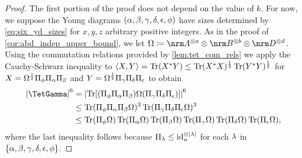 \documentclass[notitlepage, 10pt]{article}
\begin{document}
\begin{proof}
    The first portion of the proof does not depend on the value of $k$.
    For now, we suppose the Young diagrams $(\alpha,\beta,\gamma,\delta,\epsilon,\phi)$ have sizes determined by \cref{eq:six_yd_sizes} for $x,y,z$ arbitrary positive integers.
    As in the proof of \cref{cor:abd_indep_upper_bound}, we let $\Omega \coloneqq \nrm A^{\ot a} \ot \nrm B^{\ot b} \ot \nrm D^{\ot d}$.
    Using the commutation relations provided by \cref{lem:tet_com_rels} we apply the Cauchy-Schwarz inequality to $\braket{X,Y} = \operatorname{Tr}(X^{*} Y) \leq \operatorname{Tr}(X^{*}X)^{\frac{1}{2}}\operatorname{Tr}(Y^{*}Y)^{\frac{1}{2}}$ for $X = \Omega^{\frac{1}{2}}\Pi_{\phi}\Pi_{\alpha}\Pi_{\beta}$ and $Y = \Omega^{\frac{1}{2}}\Pi_{\gamma} \Pi_{\delta} \Pi_{\epsilon}$ to obtain
    \begin{align}
        \begin{split}
            \abs{\TetGamma}^{6} 
            &=\abs{\Tr[(\Pi_{\yf}\Pi_{\ya}\Pi_{\yb}) \Omega (\Pi_{\yc} \Pi_{\yd} \Pi_{\ye})]}^6\\
            &\leq 
            \Tr(\Pi_{\yf}\Pi_{\ya}\Pi_{\yb} \Omega)^3
            \Tr(\Pi_{\yc}\Pi_{\yd}\Pi_{\ye} \Omega)^3\\
            &\leq 
            \Tr(\Pi_{\yf}\Omega)\Tr(\Pi_{\ya}\Omega)\Tr(\Pi_{\yb} \Omega)
            \Tr(\Pi_{\yc}\Omega)\Tr(\Pi_{\yd}\Omega)\Tr(\Pi_{\ye} \Omega),
        \end{split}
    \end{align}
    where the last inequality follows because $\Pi_{\lambda} \leq \operatorname{id}_n^{\otimes \left|\lambda\right|}$ for each $\lambda$ in $\{\alpha,\beta,\gamma,\delta,\epsilon,\phi\}$.


\end{proof}
\end{document}
